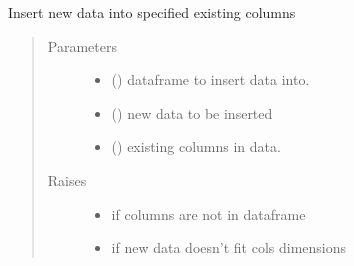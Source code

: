 \documentclass[letterpaper,10pt,english]{sphinxmanual}
\begin{document}
\begin{fulllineitems}
\label{\detokenize{dalio.util:dalio.util.level_utils.insert_cols}}
Insert new data into specified existing columns
\begin{quote}\begin{description}
\item[{Parameters}] \leavevmode\begin{itemize}
\item {} 
 () \textendash{} dataframe to insert data into.

\item {} 
 () \textendash{} new data to be inserted

\item {} 
 (\sphinxstyleliteralemphasis{\sphinxupquote{, }}\sphinxstyleliteralemphasis{\sphinxupquote{, }}) \textendash{} existing columns in data.

\end{itemize}

\item[{Raises}] \leavevmode\begin{itemize}
\item {} 
 \textendash{} if columns are not in dataframe

\item {} 
 \textendash{} if new data doesn’t fit cols dimensions

\end{itemize}

\end{description}\end{quote}

\end{fulllineitems}

\end{document}
